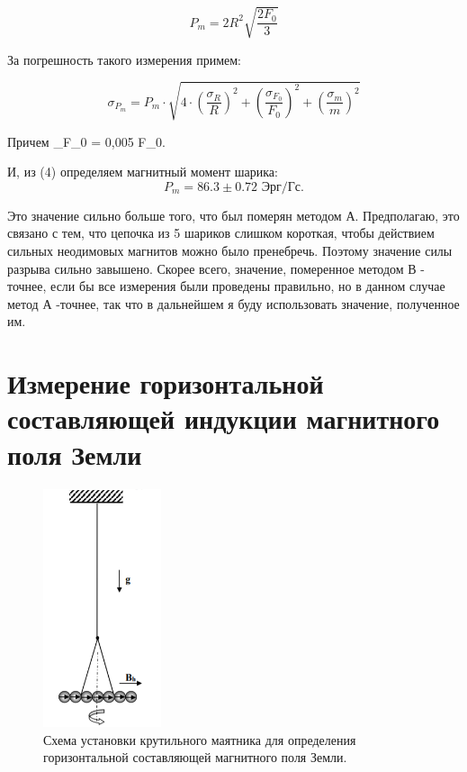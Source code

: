\documentclass[a4paper, 14pt]{extarticle}%
\newcommand\ECaption[1]{%
     \captionsetup{font=footnotesize}%
     \caption{#1}}
\newcommand\ECaption[1]{%
     \captionsetup{font=footnotesize}%
     \caption{#1}}
\begin{document}
\begin{equation}
P_m = 2R^2\sqrt{\frac{2F_0}{3}}
\end{equation}

За погрешность такого измерения примем:

\begin{equation}
\sigma_{P_m} = P_m\cdot \sqrt{4\cdot(\frac{\sigma_R}{R})^2 + (\frac{\sigma_{F_0}}{F_0})^2 + (\frac{\sigma_{m}}{m})^2}
\end{equation}

Причем \sigma_{F_0} = 0,005 \cdot F_0.

И, из (4) определяем магнитный момент шарика:
\[P_m = 86.3 \pm 0.72 \text{ Эрг/Гс}.\]

Это значение сильно больше того, что был померян методом А. Предполагаю, это связано с тем, что цепочка из 5 шариков слишком короткая, чтобы действием сильных неодимовых магнитов можно было пренебречь. Поэтому значение силы разрыва сильно завышено. Скорее всего, значение, померенное методом В - точнее, если бы все измерения были проведены правильно, но в данном случае метод А -точнее, так что в дальнейшем я буду использовать значение, полученное им.

\section{Измерение горизонтальной составляющей индукции магнитного поля Земли}

\begin{figure}
\begin{center}
\includegraphics[height=7cm]{krut.png}
\end{center}
\ECaption{Схема установки крутильного маятника для определения горизонтальной составляющей магнитного поля Земли.}
\end{figure}
\end{document}
